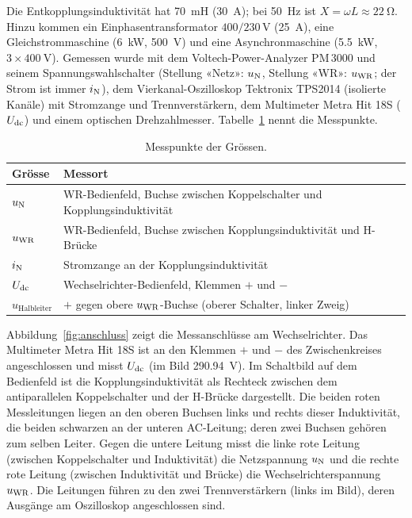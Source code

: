 Die Entkopplungsinduktivität hat \SI{70}{\milli\henry} (\SI{30}{\ampere}); bei \SI{50}{\hertz} ist $X=\omega L\approx\SI{22}{\ohm}$. Hinzu kommen ein Einphasentransformator $400/230$\,V (\SI{25}{\ampere}), eine Gleichstrommaschine (\SI{6}{\kilo\watt}, \SI{500}{\volt}) und eine Asynchronmaschine (\SI{5.5}{\kilo\watt}, $3\times\SI{400}{\volt}$). Gemessen wurde mit dem Voltech-Power-Analyzer PM\,3000 und seinem Spannungswahlschalter (Stellung «Netz»: $u_{\mathrm{N}}$, Stellung «WR»: $u_{\mathrm{WR}}$; der Strom ist immer $i_{\mathrm{N}}$), dem Vierkanal-Oszilloskop Tektronix TPS2014 (isolierte Kanäle) mit Stromzange und Trennverstärkern, dem Multimeter Metra Hit 18S ($U_{\mathrm{dc}}$) und einem optischen Drehzahlmesser. Tabelle~\ref{tab:messpunkte} nennt die Messpunkte.

\begin{table}[htbp]
  \centering
  \caption{Messpunkte der Grössen.}
  \label{tab:messpunkte}
  \small
  \begin{tabular}{@{}ll@{}}
    \toprule
    Grösse & Messort \\
    \midrule
    $u_{\mathrm{N}}$ & WR-Bedienfeld, Buchse zwischen Koppelschalter und Kopplungsinduktivität \\
    $u_{\mathrm{WR}}$ & WR-Bedienfeld, Buchse zwischen Kopplungsinduktivität und H-Brücke \\
    $i_{\mathrm{N}}$ & Stromzange an der Kopplungsinduktivität \\
    $U_{\mathrm{dc}}$ & Wechselrichter-Bedienfeld, Klemmen $+$ und $-$ \\
    $u_{\mathrm{Halbleiter}}$ & $+$ gegen obere $u_{\mathrm{WR}}$-Buchse (oberer Schalter, linker Zweig) \\
    \bottomrule
  \end{tabular}
\end{table}

Abbildung~\ref{fig:anschluss} zeigt die Messanschlüsse am Wechselrichter. Das Multimeter Metra Hit 18S ist an den Klemmen $+$ und $-$ des Zwischenkreises angeschlossen und misst $U_{\mathrm{dc}}$ (im Bild \SI{290.94}{\volt}). Im Schaltbild auf dem Bedienfeld ist die Kopplungsinduktivität als Rechteck zwischen dem antiparallelen Koppelschalter und der H-Brücke dargestellt. Die beiden roten Messleitungen liegen an den oberen Buchsen links und rechts dieser Induktivität, die beiden schwarzen an der unteren AC-Leitung; deren zwei Buchsen gehören zum selben Leiter. Gegen die untere Leitung misst die linke rote Leitung (zwischen Koppelschalter und Induktivität) die Netzspannung $u_{\mathrm{N}}$ und die rechte rote Leitung (zwischen Induktivität und Brücke) die Wechselrichterspannung $u_{\mathrm{WR}}$. Die Leitungen führen zu den zwei Trennverstärkern (links im Bild), deren Ausgänge am Oszilloskop angeschlossen sind.

